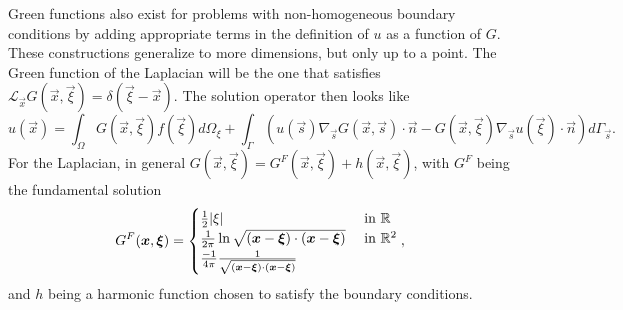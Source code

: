 Green functions also exist for problems with non-homogeneous boundary conditions by adding appropriate terms in the definition of $u$ as a function of $G$. These constructions generalize to more dimensions, but only up to a point. The Green function of the Laplacian will be the one that satisfies $\mathcal{L}_{\vec{x}}G(\vec{x},\vec{\xi})=\delta(\vec{\xi}-\vec{x})$. The solution operator then looks like
\begin{equation*}
    u(\vec{x})=\int_{\Omega}G(\vec{x},\vec{\xi})f(\vec{\xi})d\Omega_{\xi}+\int_{\Gamma}(u(\vec{s})\nabla_{\vec{s}}G(\vec{x},\vec{s})\cdot\vec{n}-G(\vec{x},\vec{\xi})\nabla_{\vec{s}}u(\vec{\xi})\cdot\vec{n})d\Gamma_{\vec{s}}.
\end{equation*}
For the Laplacian, in general $G(\vec{x},\vec{\xi})=G^{F}(\vec{x},\vec{\xi})+h(\vec{x},\vec{\xi})$, with $G^F$ being the fundamental solution 
\begin{equation*}
    G^F(\vec x, \vec\xi) = \begin{cases}
        \frac{1}{2}|\xi|&\text{ in }\R\\
        \frac{1}{2\pi}\ln\sqrt{(\vec x -\vec \xi)\cdot(\vec x - \vec \xi)} &\text{ in }\R^2\\
        \frac{-1}{4\pi} \frac{1}{\sqrt{(\vec x -\vec \xi)\cdot(\vec x - \vec \xi)}}
    \end{cases},
\end{equation*}
and $h$ being a harmonic function chosen to satisfy the boundary conditions.
